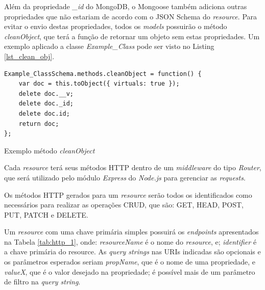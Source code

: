 Além da propriedade \textit{\_id} do MongoDB, o Mongoose também adiciona outras propriedades que não estariam de acordo com o JSON Schema do \textit{resource}. Para evitar o envio destas propriedades, todos os \textit{models} possuirão o método \textit{cleanObject}, que terá a função de retornar um objeto sem estas propriedades. Um exemplo aplicado a classe \textit{Example\_Class} pode ser visto no Listing \ref{lst_clean_obj}.

\begin{listing}
\begin{verbatim}
Example_ClassSchema.methods.cleanObject = function() {
    var doc = this.toObject({ virtuals: true });
    delete doc.__v;
    delete doc._id;
    delete doc.id;
    return doc;
};
\end{verbatim}
\caption{Exemplo método \textit{cleanObject}}
\label{lst_clean_obj}
\end{listing}


\label{sec:bnf:http}

Cada \textit{resource} terá seus métodos HTTP dentro de um \textit{middleware} do tipo \textit{Router}, que será utilizado pelo módulo \textit{Express} do \textit{Node.js} para gerenciar as \textit{requests}.

Os métodos HTTP gerados para um \textit{resource} serão todos os identificados como necessários para realizar as operações CRUD, que são: GET, HEAD, POST, PUT, PATCH e DELETE.

Um \textit{resource} com uma chave primária simples possuirá os \textit{endpoints} apresentados na Tabela \ref{tab:http_1}, onde: \textit{resourceName} é o nome do \textit{resource}, e; \textit{identifier} é a chave primária do resource. As \textit{query strings} nas URIs indicadas são opcionais e os parâmetros esperados seriam \textit{propName}, que é o nome de uma propriedade, e \textit{valueX}, que é o valor desejado na propriedade; é possível mais de um parâmetro de filtro na \textit{query string}.

